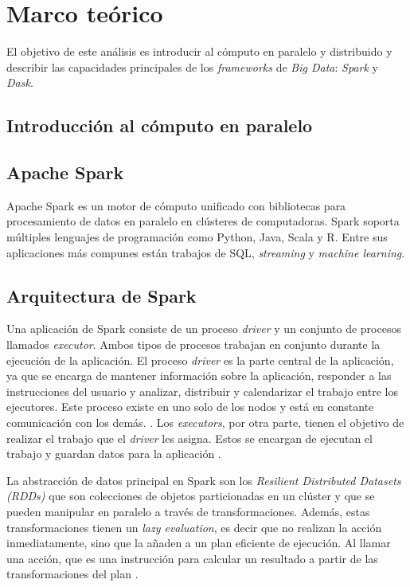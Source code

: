 \chapter{Marco teórico}

\noindent El objetivo de este análisis es introducir al cómputo en paralelo y distribuido y describir las capacidades principales de los \textit{frameworks}  de \textit{Big Data}: \textit{Spark} y \textit{Dask}.

\newpage

\section{Introducción al cómputo en paralelo}

\section{Apache Spark}

Apache Spark es un motor de cómputo unificado con bibliotecas para procesamiento de datos en paralelo en clústeres de computadoras. Spark soporta múltiples lenguajes de programación como Python, Java, Scala y R. Entre sus aplicaciones más compunes están trabajos de SQL, \textit{streaming} y \textit{machine learning}.\cite{sparkguide}

\section{Arquitectura de Spark}

Una aplicación de Spark consiste de un proceso \textit{driver} y un conjunto de procesos llamados \textit{executor}. Ambos tipos de procesos trabajan en conjunto durante la ejecución de la aplicación. El proceso \textit{driver} es la parte central de la aplicación, ya que se encarga de mantener información sobre la aplicación, responder a las instrucciones del usuario y analizar, distribuir y calendarizar el trabajo entre los ejecutores. Este proceso existe en uno solo de los nodos y está en constante comunicación con los demás. \cite{sparkguide}. Los \textit{executors}, por otra parte, tienen el objetivo de realizar el trabajo que el \textit{driver} les asigna. Estos se encargan de ejecutan el trabajo y guardan datos para la aplicación \cite{sparkclusteroverview}.

La abstracción de datos principal en Spark son los \textit{Resilient Distributed Datasets (RDDs)} que son colecciones de objetos particionadas en un clúster y que se pueden manipular en paralelo a través de transformaciones. Además, estas transformaciones tienen un \textit{lazy evaluation}, es decir que no realizan la acción inmediatamente, sino que la añaden a un plan eficiente de ejecución. Al llamar una acción, que es una instrucción para calcular un resultado a partir de las transformaciones del plan \cite{sparkguide}.  

